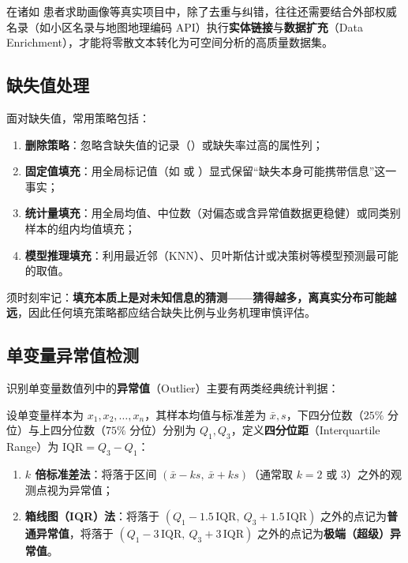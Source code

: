 在诸如  患者求助画像等真实项目中，除了去重与纠错，往往还需要结合外部权威名录（如小区名录与地图地理编码 API）执行\textbf{实体链接}与\textbf{数据扩充}（Data Enrichment），才能将零散文本转化为可空间分析的高质量数据集。

\subsection{缺失值处理}

面对缺失值，常用策略包括：
\begin{enumerate}
  \item \textbf{删除策略}：忽略含缺失值的记录（）或缺失率过高的属性列；
  \item \textbf{固定值填充}：用全局标记值（如  或 ）显式保留“缺失本身可能携带信息”这一事实；
  \item \textbf{统计量填充}：用全局均值、中位数（对偏态或含异常值数据更稳健）或同类别样本的组内均值填充；
  \item \textbf{模型推理填充}：利用最近邻（KNN）、贝叶斯估计或决策树等模型预测最可能的取值。
\end{enumerate}
须时刻牢记：\textbf{填充本质上是对未知信息的猜测——猜得越多，离真实分布可能越远}，因此任何填充策略都应结合缺失比例与业务机理审慎评估。

\subsection{单变量异常值检测}

识别单变量数值列中的\textbf{异常值}（Outlier）主要有两类经典统计判据：

\begin{definition}\label{def:outlier-rules}
设单变量样本为 $x_1, x_2, \dots, x_n$，其样本均值与标准差为 $\bar{x}, s$，下四分位数（$25\%$ 分位）与上四分位数（$75\%$ 分位）分别为 $Q_1, Q_3$，定义\textbf{四分位距}（Interquartile Range）为 $\mathrm{IQR} = Q_3 - Q_1$：
\begin{enumerate}
  \item \textbf{$k$ 倍标准差法}：将落于区间 $(\bar{x} - k s,\ \bar{x} + k s)$（通常取 $k=2$ 或 $3$）之外的观测点视为异常值；
  \item \textbf{箱线图（IQR）法}：将落于 $(Q_1 - 1.5\,\mathrm{IQR},\ Q_3 + 1.5\,\mathrm{IQR})$ 之外的点记为\textbf{普通异常值}，将落于 $(Q_1 - 3\,\mathrm{IQR},\ Q_3 + 3\,\mathrm{IQR})$ 之外的点记为\textbf{极端（超级）异常值}。
\end{enumerate}
\end{definition}

